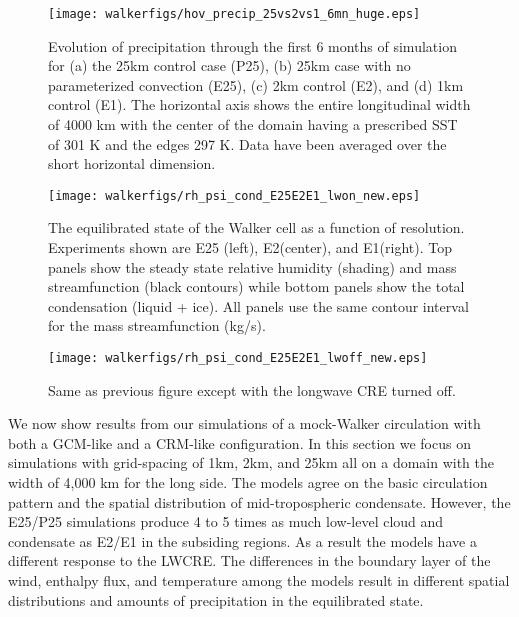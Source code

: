 \documentclass[draft]{agujournal2019}
\begin{document}
{\begin{figure}
  \texttt{[image: walkerfigs/hov\_precip\_25vs2vs1\_6mn\_huge.eps]}
  \caption{Evolution of precipitation through the first 6 months of simulation for (a) the 25km control case (P25), 
  (b) 25km case with no parameterized convection (E25), (c) 2km control (E2), and (d) 1km control (E1).  
  The horizontal axis shows the entire longitudinal width of 4000 km with the center of the domain having a prescribed SST of 301 K and the edges 297 K.  
  Data have been averaged over the short horizontal dimension.} 
  \label{fig:hov_4mods_6mn}
\end{figure}


\begin{figure}
  \centering
      \texttt{[image: walkerfigs/rh\_psi\_cond\_E25E2E1\_lwon\_new.eps]}
      \caption{The equilibrated state of the Walker cell as a function of resolution.  
      Experiments shown are E25 (left), E2(center), and E1(right). Top panels show the 
      steady state relative humidity (shading) and mass streamfunction (black contours)
      while bottom panels show the total condensation (liquid + ice).  
      All panels use the same contour interval for the 
      mass streamfunction (kg/s).}
  \label{fig:rh_psi_P25E2E1}
\end{figure}

\begin{figure}
  \centering
      \texttt{[image: walkerfigs/rh\_psi\_cond\_E25E2E1\_lwoff\_new.eps]}
          \caption{Same as previous figure except with the longwave CRE turned off.}
  \label{fig:rh_psi_P25E2E1_lwoff}
\end{figure}

We now show results from our simulations of a mock-Walker circulation with both a GCM-like and a CRM-like configuration.  
In this section we focus on simulations with grid-spacing of 
1km, 2km, and 25km all on a domain with the width of 4,000 km for the long side.  
The models agree on 
the basic circulation pattern and the spatial distribution of mid-tropospheric condensate.  
However, the E25/P25 simulations produce 4 to 5 times as much low-level cloud and 
condensate as E2/E1 in the subsiding regions.   As a result the models have a different response 
to the LWCRE.  The differences in the boundary layer of the wind, enthalpy flux, and 
temperature among the models result in different spatial distributions and amounts of 
precipitation in the equilibrated state.  

}
\end{document}
